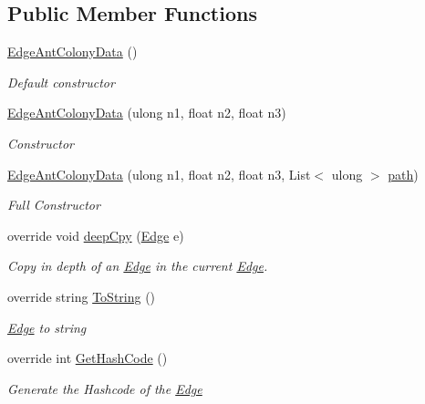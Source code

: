 \subsection*{Public Member Functions}
\begin{DoxyCompactItemize}
\item 
\hyperlink{classEdgeAntColonyData_a8a3218b8543d8d6c276e4930213ae2c1}{Edge\+Ant\+Colony\+Data} ()
\begin{DoxyCompactList}\small\item\em Default constructor \end{DoxyCompactList}\item 
\hyperlink{classEdgeAntColonyData_afc711388f9b95f3a30fbc4d70a9c1760}{Edge\+Ant\+Colony\+Data} (ulong n1, float n2, float n3)
\begin{DoxyCompactList}\small\item\em Constructor \end{DoxyCompactList}\item 
\hyperlink{classEdgeAntColonyData_a43aa1c5d885f881cd394f503925f2285}{Edge\+Ant\+Colony\+Data} (ulong n1, float n2, float n3, List$<$ ulong $>$ \hyperlink{classEdge_a60f58b7cc5e9f00c8695fce3047933d8}{path})
\begin{DoxyCompactList}\small\item\em Full Constructor \end{DoxyCompactList}\item 
override void \hyperlink{classEdgeAntColonyData_a9debcbebb6da559502b5c4a0a0879983}{deep\+Cpy} (\hyperlink{classEdge}{Edge} e)
\begin{DoxyCompactList}\small\item\em Copy in depth of an \hyperlink{classEdge}{Edge} in the current \hyperlink{classEdge}{Edge}. \end{DoxyCompactList}\item 
override string \hyperlink{classEdgeAntColonyData_a96fcbfc9f8617fbe61e23fce620db096}{To\+String} ()
\begin{DoxyCompactList}\small\item\em \hyperlink{classEdge}{Edge} to string \end{DoxyCompactList}\item 
override int \hyperlink{classEdgeAntColonyData_af572cac49302014507f7c34b1bab3e19}{Get\+Hash\+Code} ()
\begin{DoxyCompactList}\small\item\em Generate the Hashcode of the \hyperlink{classEdge}{Edge} \end{DoxyCompactList}\end{DoxyCompactItemize}
